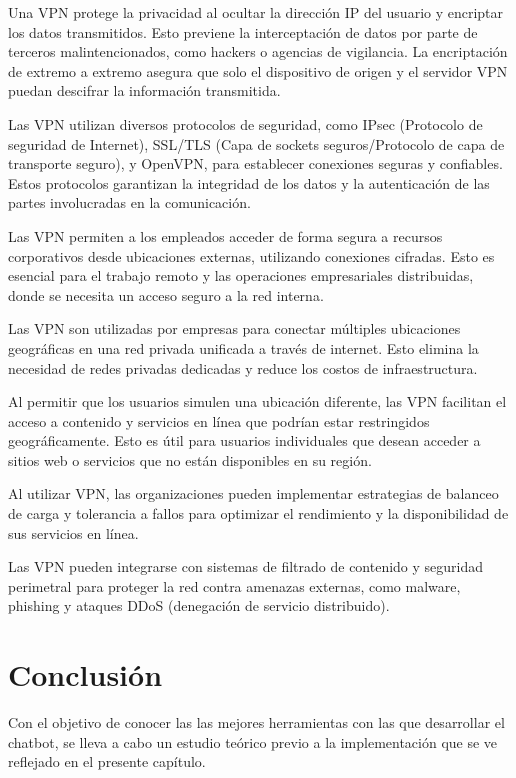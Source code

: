 Una VPN protege la privacidad al ocultar la dirección IP del usuario y encriptar los datos transmitidos. Esto previene la interceptación de datos por parte de terceros malintencionados, como hackers o agencias de vigilancia. La encriptación de extremo a extremo asegura que solo el dispositivo de origen y el servidor VPN puedan descifrar la información transmitida.

Las VPN utilizan diversos protocolos de seguridad, como IPsec (Protocolo de seguridad de Internet), SSL/TLS (Capa de sockets seguros/Protocolo de capa de transporte seguro), y OpenVPN, para establecer conexiones seguras y confiables. Estos protocolos garantizan la integridad de los datos y la autenticación de las partes involucradas en la comunicación.

Las VPN permiten a los empleados acceder de forma segura a recursos corporativos desde ubicaciones externas, utilizando conexiones cifradas. Esto es esencial para el trabajo remoto y las operaciones empresariales distribuidas, donde se necesita un acceso seguro a la red interna.

Las VPN son utilizadas por empresas para conectar múltiples ubicaciones geográficas en una red privada unificada a través de internet. Esto elimina la necesidad de redes privadas dedicadas y reduce los costos de infraestructura.

Al permitir que los usuarios simulen una ubicación diferente, las VPN facilitan el acceso a contenido y servicios en línea que podrían estar restringidos geográficamente. Esto es útil para usuarios individuales que desean acceder a sitios web o servicios que no están disponibles en su región.

Al utilizar VPN, las organizaciones pueden implementar estrategias de balanceo de carga y tolerancia a fallos para optimizar el rendimiento y la disponibilidad de sus servicios en línea.

Las VPN pueden integrarse con sistemas de filtrado de contenido y seguridad perimetral para proteger la red contra amenazas externas, como malware, phishing y ataques DDoS (denegación de servicio distribuido).

\section{Conclusión}

Con el objetivo de conocer las las mejores herramientas con las que desarrollar el chatbot, se lleva a cabo un estudio teórico previo a la implementación que se ve reflejado en el presente capítulo.

